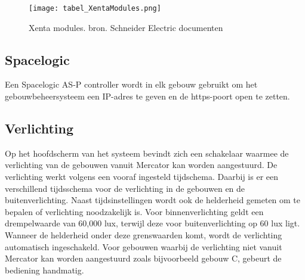 \begin{figure}
  \centering
  \texttt{[image: tabel\_XentaModules.png]}
  \caption[Xenta modules. bron. Schneider Electric documenten]{\label{fig:xentamodules}Xenta modules. bron. Schneider Electric documenten}
\end{figure}

\subsection{Spacelogic}
Een Spacelogic AS-P controller wordt in elk gebouw gebruikt om het gebouwbeheersysteem een IP-adres te geven en de https-poort open te zetten.

\subsection{Verlichting}
Op het hoofdscherm van het systeem bevindt zich een schakelaar waarmee de verlichting van de gebouwen vanuit Mercator kan worden aangestuurd. De verlichting werkt volgens een vooraf ingesteld tijdschema. Daarbij is er een verschillend tijdsschema voor de verlichting in de gebouwen en de buitenverlichting. \newline \newline
Naast tijdsinstellingen wordt ook de helderheid gemeten om te bepalen of verlichting noodzakelijk is. Voor binnenverlichting geldt een drempelwaarde van 60,000 lux, terwijl deze voor buitenverlichting op 60 lux ligt. Wanneer de helderheid onder deze grenswaarden komt, wordt de verlichting automatisch ingeschakeld. Voor gebouwen waarbij de verlichting niet vanuit Mercator kan worden aangestuurd zoals bijvoorbeeld gebouw C, gebeurt de bediening handmatig.


